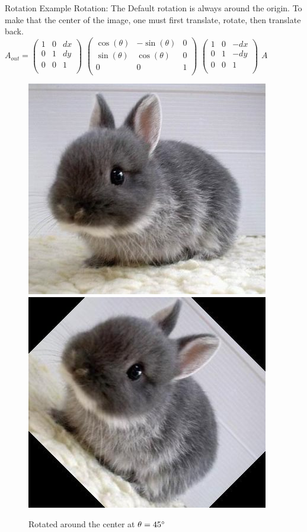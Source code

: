 \documentclass{beamer}
\begin{document}
\begin{frame}{Rotation}
Example Rotation:
The Default rotation is always around the origin. To make that the center of the image, one must first translate, rotate, then translate back.
\hspace{0.1 in}
\\
$A_{out} = \begin{pmatrix}
	1 & 0 & dx\\
	0 & 1 & dy\\
	0 & 0 & 1\\
\end{pmatrix}$
$\begin{pmatrix}
	\cos(\theta) & -\sin(\theta) & 0\\
	\sin(\theta)& \cos(\theta) & 0\\
	0 & 0 & 1\\
\end{pmatrix}$
$\begin{pmatrix}
	1 & 0 & -dx\\
	0 & 1 & -dy\\
	0 & 0 & 1\\
\end{pmatrix}$
$A$
\\
\begin{figure}


\includegraphics[width = 1.1 in]{bunnycute.jpg}
\hspace{0.5 in}
\includegraphics[width = 1.1 in]{bunnycuteRot.jpg}
\caption{Rotated around the center at $\theta = 45\degree$}
\end{figure}
\end{frame}
\end{document}
